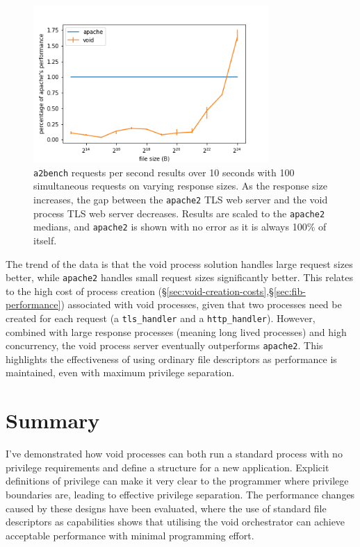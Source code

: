 \documentclass[12pt,a4paper,twoside]{report}
\begin{document}
\begin{figure}
    \centering
    \includegraphics[width=0.8\textwidth]{graphs/tls_relative_performance.png}

    \caption{\texttt{a2bench} requests per second results over 10 seconds with 100 simultaneous requests on varying response sizes. As the response size increases, the gap between the \texttt{apache2} TLS web server and the void process TLS web server decreases. Results are scaled to the \texttt{apache2} medians, and \texttt{apache2} is shown with no error as it is always 100\% of itself.}
    \label{fig:tls-relative-performance}
\end{figure}

The trend of the data is that the void process solution handles large request sizes better, while \texttt{apache2} handles small request sizes significantly better. This relates to the high cost of process creation (§\ref{sec:void-creation-costs},§\ref{sec:fib-performance}) associated with void processes, given that two processes need be created for each request (a \texttt{tls\_handler} and a \texttt{http\_handler}). However, combined with large response processes (meaning long lived processes) and high concurrency, the void process server eventually outperforms \texttt{apache2}. This highlights the effectiveness of using ordinary file descriptors as performance is maintained, even with maximum privilege separation.

\section{Summary}

I've demonstrated how void processes can both run a standard process with no privilege requirements and define a structure for a new application. Explicit definitions of privilege can make it very clear to the programmer where privilege boundaries are, leading to effective privilege separation. The performance changes caused by these designs have been evaluated, where the use of standard file descriptors as capabilities shows that utilising the void orchestrator can achieve acceptable performance with minimal programming effort.
\end{document}
